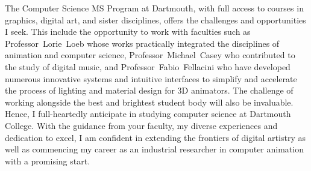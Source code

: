 \documentclass[a4paper, 11pt]{article}
\begin{document}
The Computer Science MS Program at Dartmouth, with full access to courses in graphics, digital art, and sister disciplines, offers the challenges and opportunities I seek. This include the opportunity to work with faculties such as \mbox{Professor~Lorie~Loeb} whose works practically integrated the disciplines of animation and computer science, \mbox{Professor~Michael~Casey} who contributed to the study of digital music, and \mbox{Professor~Fabio~Fellacini} who have developed numerous innovative systems and intuitive interfaces to simplify and accelerate the process of lighting and material design for 3D animators. The challenge of working alongside the best and brightest student body will also be invaluable. Hence, I full-heartedly anticipate in studying computer science at Dartmouth College. With the guidance from your faculty, my diverse experiences and dedication to excel, I am confident in extending the frontiers of digital artistry as well as commencing my career as an industrial researcher in computer animation with a promising start.

\end{document}
